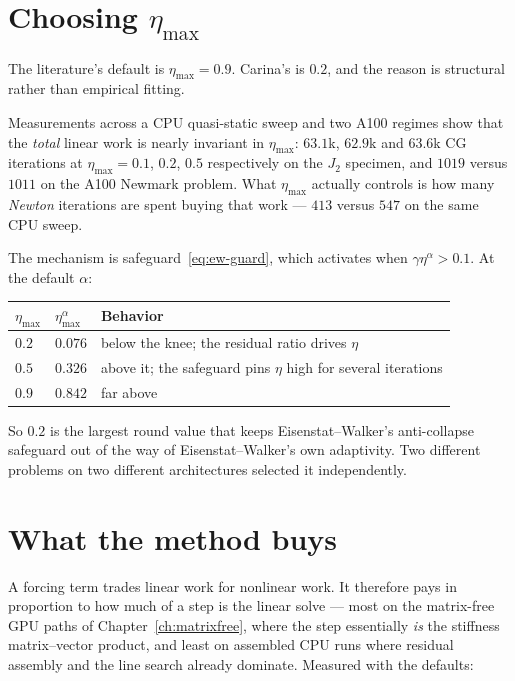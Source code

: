 \section{Choosing \texorpdfstring{$\eta_{\max}$}{eta max}}
\label{sec:etamax}

The literature's default is $\eta_{\max} = 0.9$.  Carina's is $0.2$, and the
reason is structural rather than empirical fitting.

Measurements across a CPU quasi-static sweep and two A100 regimes show that the
\emph{total} linear work is nearly invariant in $\eta_{\max}$: $63.1$k, $62.9$k
and $63.6$k CG iterations at $\eta_{\max} = 0.1$, $0.2$, $0.5$ respectively on
the $J_2$ specimen, and $1019$ versus $1011$ on the A100 Newmark problem.  What
$\eta_{\max}$ actually controls is how many \emph{Newton} iterations are spent
buying that work --- $413$ versus $547$ on the same CPU sweep.

The mechanism is safeguard~\eqref{eq:ew-guard}, which activates when
$\gamma\eta^{\alpha} > 0.1$.  At the default $\alpha$:
\begin{center}
\begin{tabular}{@{}lll@{}}
\toprule
$\eta_{\max}$ & $\eta_{\max}^{\alpha}$ & Behavior \\
\midrule
$0.2$ & $0.076$ & below the knee; the residual ratio drives $\eta$ \\
$0.5$ & $0.326$ & above it; the safeguard pins $\eta$ high for several iterations \\
$0.9$ & $0.842$ & far above \\
\bottomrule
\end{tabular}
\end{center}
So $0.2$ is the largest round value that keeps Eisenstat--Walker's
anti-collapse safeguard out of the way of Eisenstat--Walker's own adaptivity.
Two different problems on two different architectures selected it
independently.

\section{What the method buys}

A forcing term trades linear work for nonlinear work.  It therefore pays in
proportion to how much of a step is the linear solve --- most on the
matrix-free GPU paths of Chapter~\ref{ch:matrixfree}, where the step
essentially \emph{is} the stiffness matrix--vector product, and least on
assembled CPU runs where residual assembly and the line search already
dominate.  Measured with the defaults:

